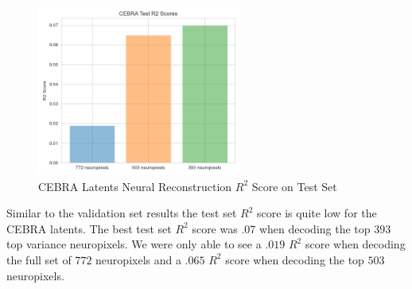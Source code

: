 \documentclass[12pt, letterpaper]{article}
\begin{document}
\begin{figure}[H]
    \centering
    \includegraphics[width=0.6\textwidth]{cebra_test_r2_scores.png}
    \caption{CEBRA Latents Neural Reconstruction $R^2$ Score on Test Set}
    \label{fig:cebra_latents_neural_reconstruction_test_set}
\end{figure}

Similar to the validation set results the test set $R^2$ score is quite low for the CEBRA \cite{schneider2023} latents. The best test set $R^2$ score was $.07$ when decoding the top $393$ top variance neuropixels. We were only able to see a $.019$ $R^2$ score when decoding the full set of $772$ neuropixels and a $.065$ $R^2$ score when decoding the top $503$ neuropixels.
\end{document}
